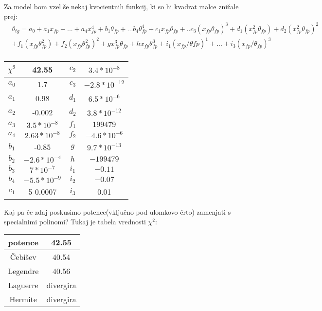\documentclass{article}
\begin{document}
Za model bom vzel še nekaj kvocientnih funkcij, ki so hi kvadrat malce znižale prej:
\begin{align*}
&\theta_{tg} = a_0 + a_1 x_{fp} + ... + a_4 x_{fp}^4 + b_1 \theta_{fp} + ... b_4 \theta_{fp}^4 + c_1 x_{fp} \theta_{fp} + .. c_3 (x_{fp} \theta_{fp})^3 + d_1 (x_{fp}^2 \theta_{fp}) + d_2 (x_{fp}^2 \theta_{fp})^2\\
&+ f_1 (x_{fp} \theta_{fp}^2) + f_2 (x_{fp} \theta_{fp}^2)^2 + g x_{fp}^3 \theta_{fp} + h x_{fp} \theta_{fp}^3 +i_1 (x_{fp}/\theta{fp})^1 + ... + i_3(x_{fp}/\theta_{fp})^3 \\
\end{align*}
\begin{center}
\begin{tabular}{|c|c|c|c|}
\hline
$\chi^2$ & 42.55 &$c_2$ & $3.4*10^{-8}$\\ \hline
$a_0$ & 1.7 &$c_3$ & $-2.8*10^{-12}$\\ \hline
$a_1$ & 0.98 &$d_1$ & $6.5*10^{-6}$\\ \hline
$a_2$ & -0.002 &$d_2$ & $3.8*10^{-12}$\\ \hline
$a_3$ & $3.5*10^{-8}$ &$f_1$ & $199479$\\ \hline
$a_4$ & $2.63*10^{-8}$ &$f_2$ & $-4.6*10^{-6}$\\ \hline
$b_1$ & -0.85 &$g$ & $9.7*10^{-13}$\\ \hline
$b_2$ & $-2.6*10^{-4}$ &$h$ & $-199479$\\ \hline
$b_3$ & $7*10^{-7}$ &$i_1$ & $-0.11$\\ \hline
$b_4$ & $-5.5*10^{-9}$ &$i_2$ & $-0.07$\\ \hline
$c_1$ & 5 $0.0007$ &$i_3$ & 0.01\\ \hline
\end{tabular}
\end{center}

Kaj pa če zdaj poskusimo potence(vključno pod ulomkovo črto) zamenjati s specialnimi polinomi? Tukaj je tabela vrednosti $\chi^2$:
\begin{center}
\begin{tabular}{|c|c|}
\hline
potence& 42.55 \\ \hline
Čebišev& 40.54 \\ \hline
Legendre& 40.56 \\ \hline
Laguerre& divergira \\ \hline
Hermite & divergira \\ \hline
\end{tabular}
\end{center}
\newpage
\end{document}
